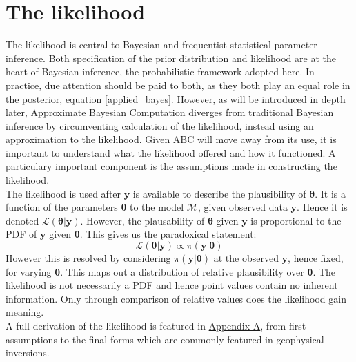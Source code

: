 \section{The likelihood}

The likelihood is central to Bayesian and frequentist statistical parameter inference. Both specification of the prior distribution and likelihood are at the heart of Bayesian inference, the probabilistic framework adopted here. In practice, due attention should be paid to both, as they both play an equal role in the posterior, equation \ref{applied_bayes}. However, as will be introduced in depth later, Approximate Bayesian Computation diverges from traditional Bayesian inference by circumventing calculation of the likelihood, instead using an approximation to the likelihood. Given ABC will move away from its use, it is important to understand what the likelihood offered and how it functioned. A particulary important component is the assumptions made in constructing the likelihood. \\

The likelihood is used after $\bm{y}$ is available to describe the plausibility of $\bm{\theta}$. It is a function of the parameters $\bm{\theta}$ to the model $\mathcal{M}$, given observed data $\bm{y}$. Hence it is denoted $\mathcal{L}(\bm{\theta}|\bm{y})$. However, the plausability of $\bm{\theta}$ given $\bm{y}$ is proportional to the PDF of $\bm{y}$ given $\bm{\theta}$. This gives us the paradoxical statement:
\begin{equation}
\mathcal{L}(\bm{\theta}|\bm{y}) \propto \pi(\bm{y}|\bm{\theta})
\label{likelihood_def}
\end{equation}
However this is resolved by considering $\pi(\bm{y}|\bm{\theta})$ at the observed $\bm{y}$, hence fixed, for varying $\bm{\theta}$. This maps out a distribution of relative plausibility over $\bm{\theta}$. The likelihood is not necessarily a PDF and hence point values contain no inherent information. Only through comparison of relative values does the likelihood gain meaning.\\

A full derivation of the likelihood is featured in \hyperref[AppendixA]{Appendix A}, from first assumptions to the final forms which are commonly featured in geophysical inversions.\\


